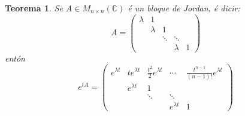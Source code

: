 \documentclass[11pt, a4paper,twoside]{article}
\theoremstyle{theorem-style}  %
\newtheorem{theorem}{Teorema}[section]  %
\theoremstyle{definition-style}
\theoremstyle{example-style}
\begin{document}
\begin{theorem}
	Se $ A\in M_{n\times n}(\mathbb{C}) $ é un bloque de Jordan, é dicir:
	\[ A=\begin{pmatrix}
	\lambda & 1  \\
	& \lambda & 1  \\
	& & \ddots & \ddots \\
	& & & \lambda & 1
	\end{pmatrix} \] entón 
	\[ e^{tA}=\begin{pmatrix}
	e^{\lambda t} & t e^{\lambda t} & \frac{t^2}{2} e^{\lambda t} & \cdots & \frac{t^{n-1}}{(n-1)!} e^{\lambda t}  \\
	& e^{\lambda t} & 1  \\
	& & \ddots & \ddots \\
	& & & e^{\lambda t} & 1
	\end{pmatrix} \]
\end{theorem}
\end{document}
